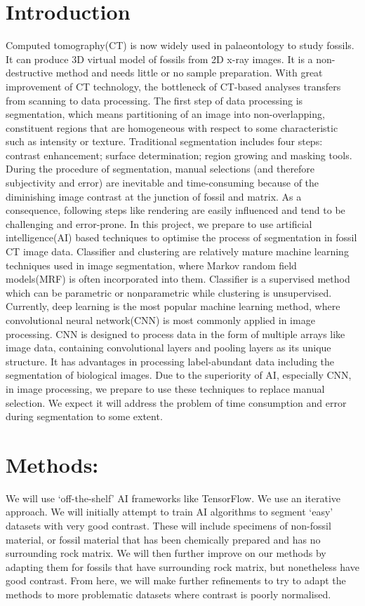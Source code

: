 \documentclass[11pt,a4paper]{article}
\begin{document}
\section{Introduction}
Computed tomography(CT) is now widely used in palaeontology to study fossils. It can produce 3D virtual model of fossils from 2D x-ray images. It is a non-destructive method and needs little or no sample preparation\citep{Dierick2007}. With great improvement of CT technology, the bottleneck of CT-based analyses transfers from scanning to data processing\citep{Abel2012}. The first step of data processing is segmentation, which means partitioning of an image into non-overlapping, constituent regions that are homogeneous with respect to some characteristic such as intensity or texture\citep{doi:10.1146/annurev.bioeng.2.1.315}. Traditional segmentation includes four steps: contrast enhancement; surface determination; region growing and masking tools\citep{Abel2012}. During the procedure of segmentation, manual selections (and therefore subjectivity and error) are inevitable and time-consuming because of the diminishing image contrast at the junction of fossil and matrix. As a consequence, following steps like rendering are easily influenced and tend to be challenging and error-prone.
In this project, we prepare to use artificial intelligence(AI) based techniques to optimise the process of segmentation in fossil CT image data. Classifier and clustering are relatively mature machine learning techniques used in image segmentation, where Markov random field models(MRF) is often incorporated into them\citep{doi:10.1146/annurev.bioeng.2.1.315}. Classifier is a supervised method which can be parametric or nonparametric while clustering is unsupervised. Currently, deep learning is the most popular machine learning method, where convolutional neural network(CNN) is most commonly applied in image processing. CNN is designed to process data in the form of multiple arrays like image data, containing convolutional layers and pooling layers as its unique structure\citep{Lecun2015}. It has advantages in processing label-abundant data including the segmentation of biological images\citep{Ning2005}.
Due to the superiority of AI, especially CNN, in image processing, we prepare to use these techniques to replace manual selection. We expect it will address the problem of time consumption and error during segmentation to some extent.
 
\section{Methods:}
 We will use ‘off-the-shelf’ AI frameworks like TensorFlow. We use an iterative approach. We will initially attempt to train AI algorithms to segment ‘easy’ datasets with very good contrast. These will include specimens of non-fossil material, or fossil material that has been chemically prepared and has no surrounding rock matrix. We will then further improve on our methods by adapting them for fossils that have surrounding rock matrix, but nonetheless have good contrast. From here, we will make further refinements to try to adapt the methods to more problematic datasets where contrast is poorly normalised.
\end{document}
